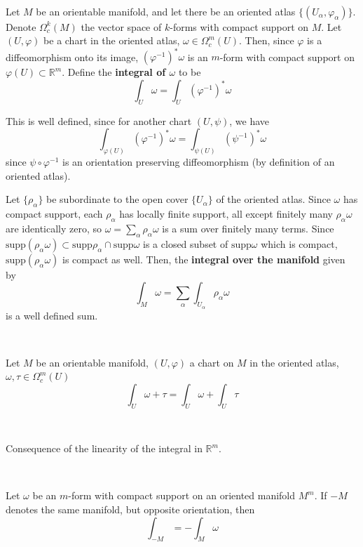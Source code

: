 \documentclass{article}
\begin{document}
\begin{definition}
  \

  Let $M$ be an orientable manifold, and let there be an oriented atlas $\{(U_\alpha, \varphi_\alpha)\}$. Denote $\Omega_c^k(M)$ the vector space of $k$-forms with compact support on $M$. Let $(U, \varphi)$ be a chart in the oriented atlas, $\omega \in \Omega^m_c(U)$. Then, since $\varphi$ is a diffeomorphism onto its image, $(\varphi ^{-1})^* \omega$ is an $m$-form with compact support on $\varphi(U) \subset \mathbb{R}^m$. Define the \textbf{integral of $\omega$} to be $$\int_U \omega = \int_U (\varphi ^{-1})^* \omega$$

  This is well defined, since for another chart $(U,\psi)$, we have $$\int_{\varphi(U)} (\varphi ^{-1})^* \omega = \int_{\psi(U)} (\psi ^{-1})^*\omega$$since $\psi \circ \varphi ^{-1}$ is an orientation preserving diffeomorphism (by definition of an oriented atlas).

  Let $\{\rho_\alpha\}$ be subordinate to the open cover $\{U_\alpha\}$ of the oriented atlas. Since $\omega$ has compact support, each $\rho_\alpha$ has locally finite support, all except finitely many $\rho_\alpha \omega$ are identically zero, so $\omega = \sum_\alpha \rho_\alpha \omega$ is a sum over finitely many terms. Since $\text{supp}(\rho_\alpha\omega) \subset \text{supp}\rho_\alpha\cap \text{supp} \omega$ is a closed subset of $\text{supp} \omega$ which is compact, $\text{supp}(\rho_\alpha \omega)$ is compact as well. Then, the \textbf{integral over the manifold} given by $$\int_M \omega = \sum_\alpha \int_{U_\alpha} \rho_\alpha \omega$$is a well defined sum.
\end{definition}

\begin{proposition}
  \

  Let $M$ be an orientable manifold, $(U, \varphi)$ a chart on $M$ in the oriented atlas, $\omega, \tau \in \Omega^m_c(U)$ $$\int_U \omega + \tau = \int_U \omega + \int_U \tau$$
\end{proposition}

\begin{customproof}
  \

  Consequence of the linearity of the integral in $\mathbb{R}^m$.
\end{customproof}

\begin{proposition}
  \

  Let $\omega$ be an $m$-form with compact support on an oriented manifold $M^m$. If $-M$ denotes the same manifold, but opposite orientation, then $$\int_{-M} = -\int_M \omega$$
\end{proposition}
\end{document}

